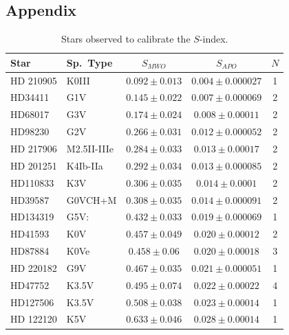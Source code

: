 


\begin{subappendices}
\section*{Appendix}

\begin{table}[H]
\begin{center}
\caption{Stars observed to calibrate the $S$-index. \label{tab:cals}}
\begin{tabular}{l l c c c}
Star & Sp.~Type & $S_{MWO}$ & $S_{APO}$ & $N$ \\
\hline
HD 210905 & K0III & $0.092 \pm 0.013$ & $0.004 \pm 0.000027$ & 1 \\
HD34411 & G1V & $0.145 \pm 0.022$ & $0.007 \pm 0.000069$ & 2 \\
HD68017 & G3V & $0.174 \pm 0.024$ & $0.008 \pm 0.00011$ & 2 \\
HD98230 & G2V & $0.266 \pm 0.031$ & $0.012 \pm 0.000052$ & 2 \\
HD 217906 & M2.5II-IIIe & $0.284 \pm 0.033$ & $0.013 \pm 0.00017$ & 2 \\
HD 201251 & K4Ib-IIa & $0.292 \pm 0.034$ & $0.013 \pm 0.000085$ & 2 \\
HD110833 & K3V & $0.306 \pm 0.035$ & $0.014 \pm 0.0001$ & 2 \\
HD39587 & G0VCH+M & $0.308 \pm 0.035$ & $0.014 \pm 0.000091$ & 2 \\
HD134319 & G5V: & $0.432 \pm 0.033$ & $0.019 \pm 0.000069$ & 1 \\
HD41593 & K0V & $0.457 \pm 0.049$ & $0.020 \pm 0.00012$ & 2 \\
HD87884 & K0Ve & $0.458 \pm 0.06$ & $0.020 \pm 0.00018$ & 3 \\
HD 220182 & G9V & $0.467 \pm 0.035$ & $0.021 \pm 0.000051$ & 1 \\
HD47752 & K3.5V & $0.495 \pm 0.074$ & $0.022 \pm 0.00022$ & 4 \\
HD127506 & K3.5V & $0.508 \pm 0.038$ & $0.023 \pm 0.00014$ & 1 \\
HD 122120 & K5V & $0.633 \pm 0.046$ & $0.028 \pm 0.00014$ & 1 \\

\end{tabular}
\end{center}
\end{table}
\end{subappendices}
